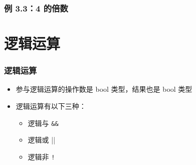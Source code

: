 \begin{frame}[fragile]
    \frametitle{例 3.3：4 的倍数}

\end{frame}


\section{逻辑运算}

\begin{frame}[fragile]
    \frametitle{逻辑运算}

    \begin{itemize}
        \item 参与逻辑运算的操作数是 bool 类型，结果也是 bool 类型

        \item 逻辑运算有以下三种：

            \begin{itemize}
                \item 逻辑与 \lstinline|&&|
                \item 逻辑或 \lstinline||||
                \item 逻辑非 \lstinline|!|
            \end{itemize}

    \end{itemize}
\end{frame}


